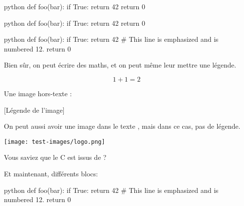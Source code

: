 \documentclass[small]{zmdocumentdd}
\begin{document}
\begin{CodeBlock}{python}
def foo(bar):
    if True:
        return 42
    return 0
\end{CodeBlock}

\begin{CodeBlock}[][1, 3-4]{python}
def foo(bar):
    if True:
        return 42
    return 0
\end{CodeBlock}

\begin{CodeBlock}[][12][10]{python}
def foo(bar):
    if True:
        return 42 # This line is emphasized and is numbered 12.
    return 0
\end{CodeBlock}

Bien sûr, on peut écrire des maths, et on peut même leur mettre une légende.

\[
   1 + 1 = 2
\]

Une image hors-texte :

[Légende de l’image]

On peut aussi avoir une image dans le texte , mais dans ce cas, pas de légende.

\begin{center}
\texttt{[image: test-images/logo.png]}
\end{center}

Vous saviez que le C est issus de  ?


Et maintenant, différents blocs:

\begin{Information}
\blindtext
\begin{Question}
\blindtext
\end{Question}
\end{Information}

\begin{Question}
\blindtext
\begin{CodeBlock}[][12][10]{python}
def foo(bar):
    if True:
        return 42 # This line is emphasized and is numbered 12.
    return 0
\end{CodeBlock}
\blindtext
\end{Question}

\begin{Warning}
\blindtext
\end{Warning}
\end{document}
